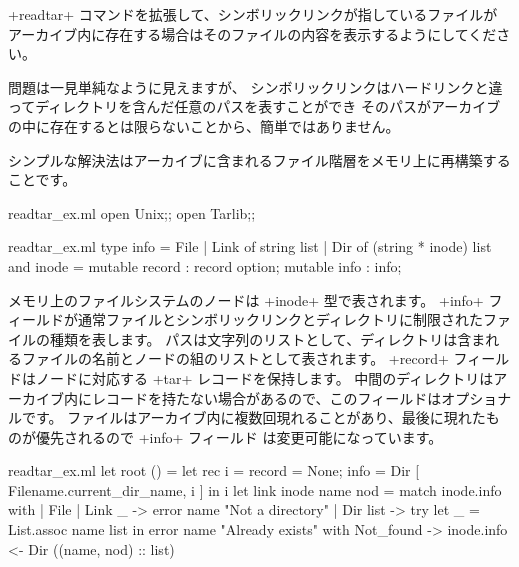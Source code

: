 \begin{exercise}\label{ex/readtar}
\ml+readtar+ コマンドを拡張して、シンボリックリンクが指しているファイルが
アーカイブ内に存在する場合はそのファイルの内容を表示するようにしてください。
\end{exercise}
\begin{answer}
問題は一見単純なように見えますが、
シンボリックリンクはハードリンクと違ってディレクトリを含んだ任意のパスを表すことができ
そのパスがアーカイブの中に存在するとは限らないことから、簡単ではありません。

シンプルな解決法はアーカイブに含まれるファイル階層をメモリ上に再構築することです。
%
\begin{codefile}{readtar_ex.ml}
open Unix;;
open Tarlib;;
\end{codefile}
%
\begin{listingcodefile}{readtar_ex.ml}
type info = File | Link of string list | Dir of (string * inode) list
and inode = { mutable record : record option; mutable info : info;}
\end{listingcodefile}
%
メモリ上のファイルシステムのノードは \ml+inode+ 型で表されます。
\ml+info+ フィールドが通常ファイルとシンボリックリンクとディレクトリに制限されたファイルの種類を表します。
パスは文字列のリストとして、ディレクトリは含まれるファイルの名前とノードの組のリストとして表されます。
\ml+record+ フィールドはノードに対応する \ml+tar+ レコードを保持します。
中間のディレクトリはアーカイブ内にレコードを持たない場合があるので、このフィールドはオプショナルです。
ファイルはアーカイブ内に複数回現れることがあり、最後に現れたものが優先されるので \ml+info+ フィールド
は変更可能になっています。
%
\begin{listingcodefile}{readtar_ex.ml}
let root () =
  let rec i =
    { record = None; info = Dir [ Filename.current_dir_name, i ] }
  in i
let link inode name nod = match inode.info with
  | File | Link _ -> error name "Not a directory"
  | Dir list ->
      try let _ = List.assoc name list in error name "Already exists"
      with Not_found -> inode.info <- Dir ((name, nod) :: list)


\end{listingcodefile}
\end{answer}
